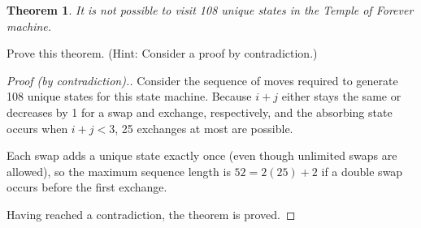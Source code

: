 \documentclass[a4paper]{article}
\newtheorem{theorem}{Theorem}[section]
\begin{document}
	\begin{theorem}
		 It is not possible to visit 108 unique states in the Temple of Forever machine.
	\end{theorem}

	Prove this theorem. (Hint: Consider a proof by contradiction.)

	\begin{proof}[Proof (by contradiction).]

		Consider the sequence of moves required to generate 108 unique
		states for this state machine. Because $i + j$ either stays the
		same or decreases by 1 for a swap and exchange, respectively,
		and the absorbing state occurs when $i + j < 3$, 25 exchanges
		at most are possible.

		Each swap adds a unique state exactly once (even though
		unlimited swaps are allowed), so the maximum sequence length is
		$52 = 2(25) + 2$ if a double swap occurs before the first exchange.

		Having reached a contradiction, the theorem is proved.

	\end{proof}
\end{document}
